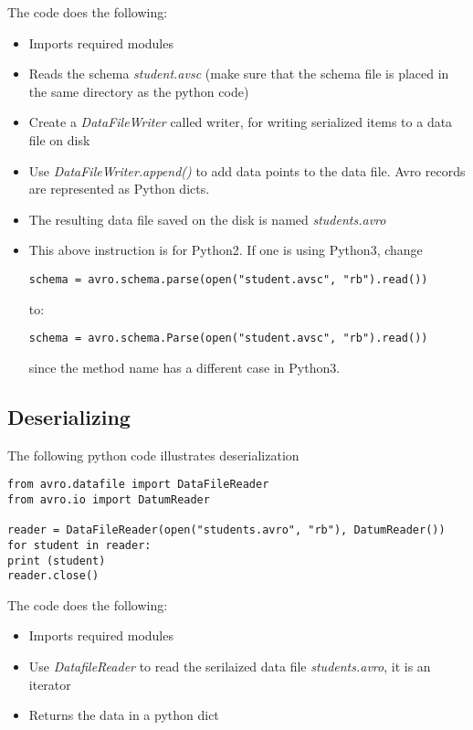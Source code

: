 The code does the following:

\begin{itemize}
\item
  Imports required modules
\item
  Reads the schema \emph{student.avsc} (make sure that the schema file
  is placed in the same directory as the python code)
\item
  Create a \emph{DataFileWriter} called writer, for writing serialized
  items to a data file on disk
\item
  Use \emph{DataFileWriter.append()} to add data points to the data
  file. Avro records are represented as Python dicts.
\item
  The resulting data file saved on the disk is named
  \emph{students.avro}
\item
  This above instruction is for Python2. If one is using Python3, change

\begin{lstlisting}
schema = avro.schema.parse(open("student.avsc", "rb").read())
\end{lstlisting}

  to:

\begin{lstlisting}
schema = avro.schema.Parse(open("student.avsc", "rb").read())
\end{lstlisting}

  since the method name has a different case in Python3.
\end{itemize}

\subsection{Deserializing}

The following python code illustrates deserialization

\begin{lstlisting}
from avro.datafile import DataFileReader
from avro.io import DatumReader

reader = DataFileReader(open("students.avro", "rb"), DatumReader())
for student in reader:
print (student)
reader.close()
\end{lstlisting}

The code does the following:

\begin{itemize}
\item
  Imports required modules
\item
  Use \emph{DatafileReader} to read the serilaized data file
  \emph{students.avro}, it is an iterator
\item
  Returns the data in a python dict
\end{itemize}

